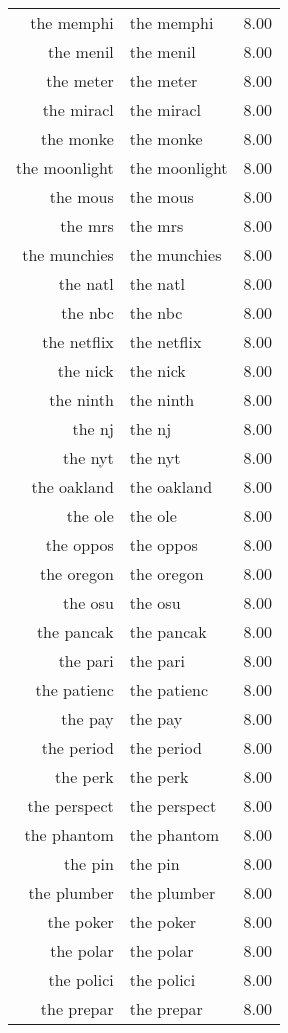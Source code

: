 \begin{table}[ht]
\begin{tabular}{rlr}
  the memphi & the memphi & 8.00 \\ 
  the menil & the menil & 8.00 \\ 
  the meter & the meter & 8.00 \\ 
  the miracl & the miracl & 8.00 \\ 
  the monke & the monke & 8.00 \\ 
  the moonlight & the moonlight & 8.00 \\ 
  the mous & the mous & 8.00 \\ 
  the mrs & the mrs & 8.00 \\ 
  the munchies & the munchies & 8.00 \\ 
  the natl & the natl & 8.00 \\ 
  the nbc & the nbc & 8.00 \\ 
  the netflix & the netflix & 8.00 \\ 
  the nick & the nick & 8.00 \\ 
  the ninth & the ninth & 8.00 \\ 
  the nj & the nj & 8.00 \\ 
  the nyt & the nyt & 8.00 \\ 
  the oakland & the oakland & 8.00 \\ 
  the ole & the ole & 8.00 \\ 
  the oppos & the oppos & 8.00 \\ 
  the oregon & the oregon & 8.00 \\ 
  the osu & the osu & 8.00 \\ 
  the pancak & the pancak & 8.00 \\ 
  the pari & the pari & 8.00 \\ 
  the patienc & the patienc & 8.00 \\ 
  the pay & the pay & 8.00 \\ 
  the period & the period & 8.00 \\ 
  the perk & the perk & 8.00 \\ 
  the perspect & the perspect & 8.00 \\ 
  the phantom & the phantom & 8.00 \\ 
  the pin & the pin & 8.00 \\ 
  the plumber & the plumber & 8.00 \\ 
  the poker & the poker & 8.00 \\ 
  the polar & the polar & 8.00 \\ 
  the polici & the polici & 8.00 \\ 
  the prepar & the prepar & 8.00 \\ 

\end{tabular}
\end{table}
